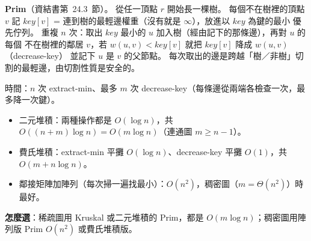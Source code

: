 \begin{pastsoln}
\textbf{Prim}（資結書第~24.3~節）。 從任一頂點 $r$ 開始長一棵樹。 每個不在樹裡的頂點 $v$ 記
$\mathit{key}[v]$ = 連到樹的最輕邊權重（沒有就是 $\infty$），放進以 $\mathit{key}$ 為鍵的最小
優先佇列。 重複 $n$ 次：取出 $\mathit{key}$ 最小的 $u$ 加入樹（經由記下的那條邊），再對 $u$ 的每個
不在樹裡的鄰居 $v$，若 $w(u, v) < \mathit{key}[v]$ 就把 $\mathit{key}[v]$ 降成 $w(u, v)$（decrease-key）
並記下 $u$ 是 $v$ 的父節點。 每次取出的邊是跨越「樹／非樹」切割的最輕邊，由切割性質是安全的。

時間：$n$ 次 extract-min、最多 $m$ 次 decrease-key（每條邊從兩端各檢查一次，最多降一次鍵）。
\begin{itemize}
\item 二元堆積：兩種操作都是 $O(\log n)$，共 $O((n + m)\log n) = O(m \log n)$（連通圖 $m \ge n - 1$）。
\item 費氏堆積：extract-min 平攤 $O(\log n)$、decrease-key 平攤 $O(1)$，共 $O(m + n \log n)$。
\item 鄰接矩陣加陣列（每次掃一遍找最小）：$O(n^2)$，稠密圖（$m = \Theta(n^2)$）時最好。
\end{itemize}

\textbf{怎麼選}：稀疏圖用 Kruskal 或二元堆積的 Prim，都是 $O(m \log n)$；稠密圖用陣列版 Prim
$O(n^2)$ 或費氏堆積版。
\end{pastsoln}

